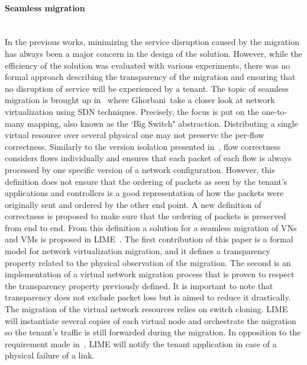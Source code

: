 \paragraph{Seamless migration}\textbf{\\}
In the previous works, minimizing the service disruption caused by the migration has always been a major concern in the design of the solution. However, while the efficiency of the solution was evaluated with various experiments, there was no formal approach describing the transparency of the migration and ensuring that no disruption of service will be experienced by a tenant.
The topic of seamless migration is brought up in~\cite{toward-Ghorbani2014} where Ghorbani~\etal take a closer look at network virtualization using SDN techniques.
Precisely, the focus is put on the one-to-many mapping, also known as the `Big Switch" abstraction.
Distributing a single virtual resource over several physical one may not preserve the per-flow correctness.
Similarly to the version isolation presented in~\cite{Liu2015a}, flow correctness considers flows individually and ensures that each packet of each flow  is always processed by one specific version of a network configuration. 
However, this definition does not ensure that the ordering of packets as seen by the tenant's applications and controllers is a good representation of how the packets were originally sent and ordered by the other end point.
A new definition of correctness is proposed to make sure that the ordering of packets is preserved from end to end.
From this definition  a solution for a seamless migration of VNs and VMs is proposed in LIME~\cite{Lime-Ghorbani2014}.
The first contribution of this paper is a formal model for network virtualization migration, and it defines a transparency property related to the physical observation of the migration.
The second is an implementation of a virtual network migration process that is proven to respect the transparency property previously defined.
It is important to note that transparency does not exclude packet loss but is aimed to reduce it drastically.
The migration of the virtual network resources relies on switch cloning.
LIME will instantiate several copies of each virtual node and orchestrate the migration so the tenant's traffic is still forwarded during the migration.
In opposition to the requirement made in~\cite{Ko2017c}, LIME will notify the tenant application in case of a physical failure of a link.

